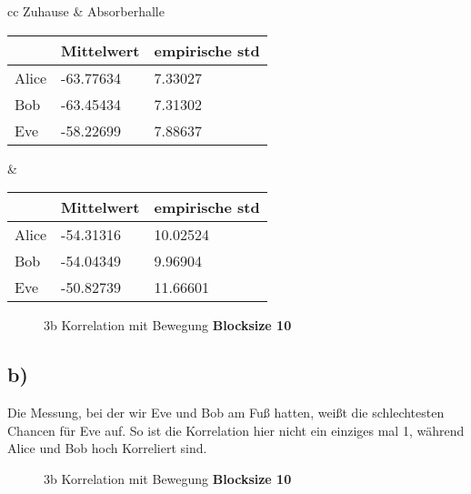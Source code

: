 \documentclass[12pt,a4paper]{article}
\begin{document}
\begin{table}[H]
\centering
\begin{tabular}{ cc }
Zuhause & Absorberhalle  \\
\begin{tabular}{l|l|l}
& Mittelwert & empirische std \\
\hline
Alice & -63.77634 & 7.33027 \\
\hline
Bob & -63.45434 & 7.31302 \\
\hline
Eve & -58.22699 & 7.88637 \\
\end{tabular} &
\begin{tabular}{l|l|l}
& Mittelwert & empirische std \\
\hline
Alice & -54.31316 & 10.02524 \\
\hline
Bob & -54.04349 & 9.96904 \\
\hline
Eve & -50.82739 & 11.66601 \\
\end{tabular}
\end{tabular}
\end{table}

\begin{figure}[H]
\centering
{}   \qquad
{}
\caption{3b Korrelation mit Bewegung \textbf{Blocksize 10}}
\label{fig:5}
\end{figure}
\subsection*{b)}
Die Messung, bei der wir Eve und Bob am Fuß hatten, weißt die schlechtesten Chancen für Eve auf. So ist die Korrelation hier nicht ein einziges mal 1, während Alice und Bob hoch Korreliert sind.
\begin{figure}[H]
\centering
{} \qquad
{}  
\caption{3b Korrelation mit Bewegung  \textbf{Blocksize 10}}
\label{fig:6}
\end{figure}
\end{document}
